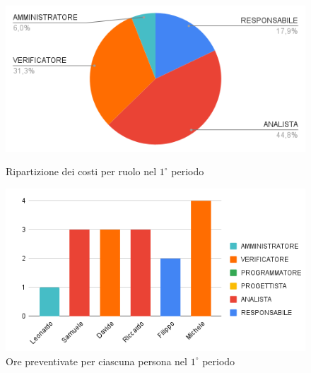 \begin{figure}[H]
  \centering
  \includegraphics[width=0.6\linewidth]{grafici/1_periodo_torta.png}
  \caption{Ripartizione dei costi per ruolo nel $1^\circ$ periodo}
        \vspace{10mm}
  \includegraphics[width=0.7\linewidth]{grafici/1_periodo_istogramma.png}
  \caption{Ore preventivate per ciascuna persona nel $1^\circ$ periodo}
\end{figure}

